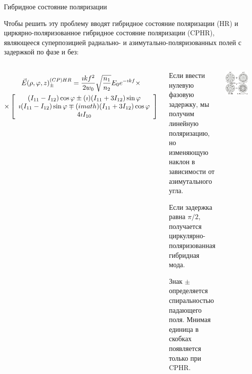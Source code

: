 \documentclass[9pt, compress, xcolor=table]{beamer}
\begin{document}
\begin{frame}{Гибридное состояние поляризации}
    
\small{Чтобы решить эту проблему вводят гибридное состояние поляризации (HR) и циркярно-поляризованное гибридное состояние поляризации (CPHR), являющееся суперпозицией радиально- и азимутально-поляризованных полей с задержкой по фазе и без:}
    \begin{columns}[c]
\column{7cm}
\begin{multline*}
\begin{gathered}
\vec E(\rho, \varphi, z)_{\pm}^{(CP)HR} = \frac{\imath k f^2}{2w_0} \sqrt
{\frac{n_1}{n_2}}E_0 e^{-\imath k f} \times\\\times \left[\array{c} 
(I_{11}-I_{12}) \cos \varphi \pm  (\imath)
(I_{11}+3 I_{12}) \sin \varphi \\  \imath (I_{11}-I_{12}) \sin
\varphi \mp (imath) (I_{11}+ 3 I_{12})
\cos \varphi\\ 4 \imath I_{10} \endarray\right]
\end{gathered}
\end{multline*}
\begin{enumerate}
  \small{  \item Если ввести нулевую фазовую задержку, мы получим линейную поляризацию, но изменяющую наклон в зависимости от азимутального угла.
    \item Если задержка равна $\pi/2$, получается циркулярно-поляризованная гибридная мода.
    \item Знак $\pm$ определяется спиральностью падающего поля. Мнимая единица в скобках появляется только при CPHR.}
\end{enumerate}
\column{5.5cm}
\begin{center}
\includegraphics[width=0.9\textwidth]{hybrid}
 \end{center}
 
\end{columns}
    
\end{frame}
\end{document}

